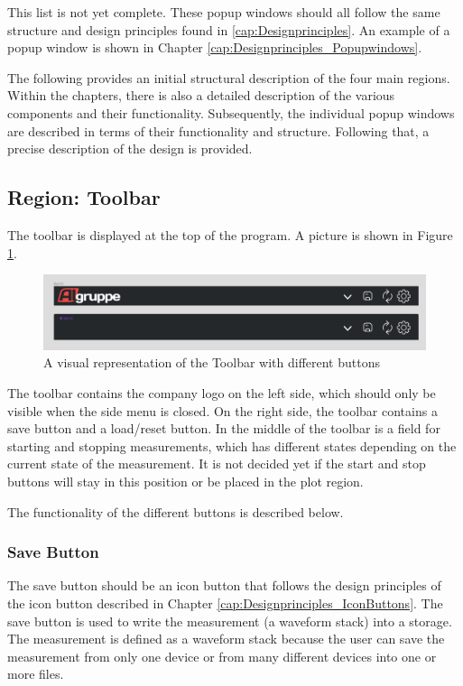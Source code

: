 \documentclass[]{scrreprt}
\begin{document}
This list is not yet complete. These popup windows should all follow the same structure and design principles found in \ref{cap:Designprinciples}. An example of a popup window is shown in Chapter \ref{cap:Designprinciples_Popupwindows}.

The following provides an initial structural description of the four main regions. Within the chapters, there is also a detailed description of the various components and their functionality. Subsequently, the individual popup windows are described in terms of their functionality and structure. Following that, a precise description of the design is provided.

\subsection{Region: Toolbar}

The toolbar is displayed at the top of the program. A picture is shown in Figure \ref{fig:toolbar}.

\begin{figure}
    \includegraphics[width=.9\textwidth]{assets/pictures/Toolbar states.png}
    \caption[]{A visual representation of the Toolbar with different buttons}
    \label{fig:toolbar}
\end{figure}

The toolbar contains the company logo on the left side, which should only be visible when the side menu is closed. On the right side, the toolbar contains a save button and a load/reset button. In the middle of the toolbar is a field for starting and stopping measurements, which has different states depending on the current state of the measurement. It is not decided yet if the start and stop buttons will stay in this position or be placed in the plot region.

The functionality of the different buttons is described below.

\subsubsection{Save Button}

The save button should be an icon button that follows the design principles of the icon button described in Chapter \ref{cap:Designprinciples_IconButtons}. The save button is used to write the measurement (a waveform stack) into a storage. The measurement is defined as a waveform stack because the user can save the measurement from only one device or from many different devices into one or more files.
\end{document}
